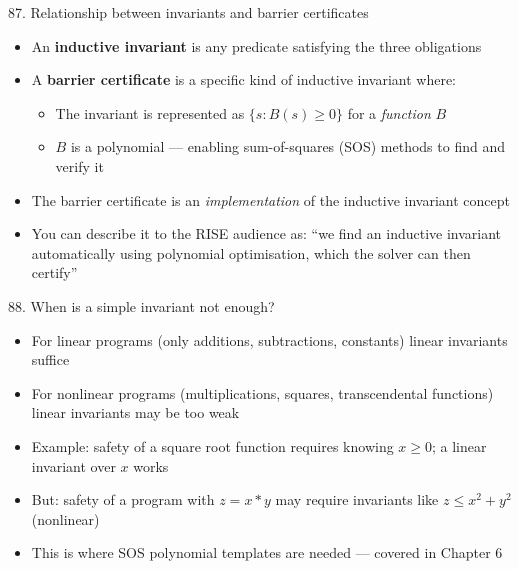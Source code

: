 \documentclass[aspectratio=169]{beamer}
\begin{document}
\begin{frame}{87. Relationship between invariants and barrier certificates}
\begin{itemize}
  \item An \textbf{inductive invariant} is any predicate satisfying the three obligations
  \item A \textbf{barrier certificate} is a specific kind of inductive invariant where:
    \begin{itemize}
      \item The invariant is represented as \(\{s : B(s) \ge 0\}\) for a \emph{function} \(B\)
      \item \(B\) is a polynomial --- enabling sum-of-squares (SOS) methods to find and verify it
    \end{itemize}
  \item The barrier certificate is an \emph{implementation} of the inductive invariant concept
  \item You can describe it to the RISE audience as: ``we find an inductive invariant automatically using polynomial optimisation, which the solver can then certify''
\end{itemize}
\end{frame}

\begin{frame}{88. When is a simple invariant not enough?}
\begin{itemize}
  \item For linear programs (only additions, subtractions, constants) linear invariants suffice
  \item For nonlinear programs (multiplications, squares, transcendental functions) linear invariants may be too weak
  \item Example: safety of a square root function requires knowing \(x \ge 0\); a linear invariant over \(x\) works
  \item But: safety of a program with \(z = x*y\) may require invariants like \(z \le x^2 + y^2\) (nonlinear)
  \item This is where SOS polynomial templates are needed --- covered in Chapter 6
\end{itemize}
\end{frame}
\end{document}
